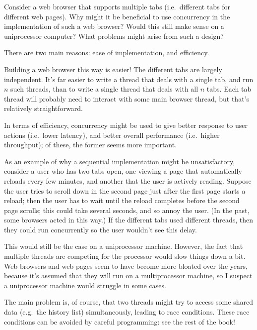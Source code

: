 \begin{questionS}
Consider a web browser that supports multiple tabs (i.e.~different
tabs for different web pages).  Why might it be beneficial to use
concurrency in the implementation of such a web browser?  Would this
still make sense on a uniprocessor computer?  What problems might
arise from such a design?
\end{questionS}


\begin{answerS}
There are two main reasons: ease of implementation, and efficiency.

Building a web browser this way is easier!  The different tabs are largely
independent.  It's far easier to write a thread that deals with a single tab,
and run $n$ such threads, than to write a single thread that deals with all
$n$ tabs.  Each tab thread will probably need to interact with some main
browser thread, but that's relatively straightforward.

In terms of efficiency, concurrency might be used to give better response to
user actions (i.e.\ lower latency), and better overall performance (i.e.\
higher throughput); of these, the former seems more important.

As an example of why a sequential implementation might be unsatisfactory,
consider a user who has two tabs open, one viewing a page that automatically
reloads every few minutes, and another that the user is actively reading.
Suppose the user tries to scroll down in the second page just after the first
page starts a reload; then the user has to wait until the reload completes
before the second page scrolls; this could take several seconds, and so annoy
the user.  (In the past, some browsers acted in this way.)  If the different
tabs used different threads, then they could run concurrently so the user
wouldn't see this delay.

This would still be the case on a uniprocessor machine.  However, the fact
that multiple threads are competing for the processor would slow things down a
bit.  Web browsers and web pages seem to have become more bloated over the
years, because it's assumed that they will run on a multiprocessor machine,
so I suspect a uniprocessor machine would struggle in some cases.

The main problem is, of course, that two threads might try to access some
shared data (e.g.~the history list) simultaneously, leading to race
conditions.  These race conditions can be avoided by careful programming: see
the rest of the book!
\end{answerS}
